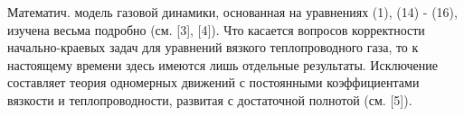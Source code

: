 \documentclass[10pt]{article}
\begin{document}
Математич. модель газовой динамики, основанная на уравнениях (1), (14) - (16), изучена весьма подробно (см. [3], [4]). Что касается вопросов корректности начально-краевых задач для уравнений вязкого теплопроводного газа, то к настоящему времени здесь имеются лишь отдельные результаты. Исключение составляет теория одномерных движений с постоянными коэффициентами вязкости и теплопроводности, развитая с достаточной полнотой (см. [5]).
\end{document}
